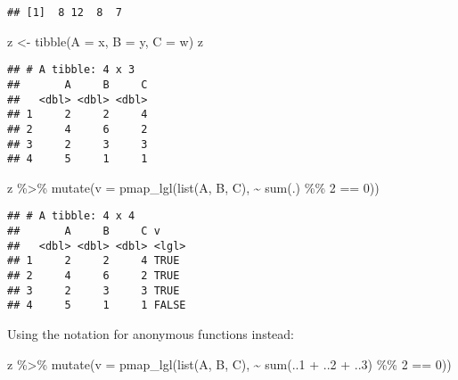 \documentclass[
]{book}
\newenvironment{Shaded}{\begin{snugshade}}{\end{snugshade}}
\newcommand{\AttributeTok}[1]{\textcolor[rgb]{0.77,0.63,0.00}{#1}}
\newcommand{\DecValTok}[1]{\textcolor[rgb]{0.00,0.00,0.81}{#1}}
\newcommand{\FunctionTok}[1]{\textcolor[rgb]{0.00,0.00,0.00}{#1}}
\newcommand{\NormalTok}[1]{#1}
\newcommand{\OtherTok}[1]{\textcolor[rgb]{0.56,0.35,0.01}{#1}}
\newcommand{\SpecialCharTok}[1]{\textcolor[rgb]{0.00,0.00,0.00}{#1}}
\begin{document}
\begin{verbatim}
## [1]  8 12  8  7
\end{verbatim}

\begin{Shaded}
\begin{Highlighting}[]
\NormalTok{z }\OtherTok{\textless{}{-}} \FunctionTok{tibble}\NormalTok{(}\AttributeTok{A =}\NormalTok{ x, }\AttributeTok{B =}\NormalTok{ y, }\AttributeTok{C =}\NormalTok{ w)}
\NormalTok{z}
\end{Highlighting}
\end{Shaded}

\begin{verbatim}
## # A tibble: 4 x 3
##       A     B     C
##   <dbl> <dbl> <dbl>
## 1     2     2     4
## 2     4     6     2
## 3     2     3     3
## 4     5     1     1
\end{verbatim}

\begin{Shaded}
\begin{Highlighting}[]
\NormalTok{z }\SpecialCharTok{\%\textgreater{}\%} \FunctionTok{mutate}\NormalTok{(}\AttributeTok{v =} \FunctionTok{pmap\_lgl}\NormalTok{(}\FunctionTok{list}\NormalTok{(A, B, C), }\SpecialCharTok{\textasciitilde{}} \FunctionTok{sum}\NormalTok{(.) }\SpecialCharTok{\%\%} \DecValTok{2} \SpecialCharTok{==} \DecValTok{0}\NormalTok{))}
\end{Highlighting}
\end{Shaded}

\begin{verbatim}
## # A tibble: 4 x 4
##       A     B     C v    
##   <dbl> <dbl> <dbl> <lgl>
## 1     2     2     4 TRUE 
## 2     4     6     2 TRUE 
## 3     2     3     3 TRUE 
## 4     5     1     1 FALSE
\end{verbatim}

Using the notation for anonymous functions instead:

\begin{Shaded}
\begin{Highlighting}[]
\NormalTok{z }\SpecialCharTok{\%\textgreater{}\%} \FunctionTok{mutate}\NormalTok{(}\AttributeTok{v =} \FunctionTok{pmap\_lgl}\NormalTok{(}\FunctionTok{list}\NormalTok{(A, B, C), }\SpecialCharTok{\textasciitilde{}} \FunctionTok{sum}\NormalTok{(..}\DecValTok{1} \SpecialCharTok{+}\NormalTok{ ..}\DecValTok{2} \SpecialCharTok{+}\NormalTok{ ..}\DecValTok{3}\NormalTok{) }\SpecialCharTok{\%\%} \DecValTok{2} \SpecialCharTok{==} \DecValTok{0}\NormalTok{))}
\end{Highlighting}
\end{Shaded}
\end{document}
